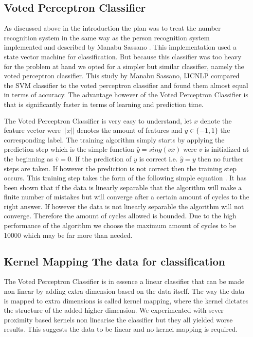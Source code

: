 \documentclass[%
        compressed,
        final,
        notitlepage,
        narroweqnarray,
        inline,
        twoside,
        ]{ieee}
\begin{document}
\subsection{Voted Perceptron Classifier}
As discussed above in the introduction the plan was to treat the number
recognition system in the same way as the person recognition system implemented
and described by Manabu Sassano \cite{Manabu}.
This implementation used a state vector machine for classification. But because
this classifier was too heavy for the problem at hand we opted for a simpler but
similar classifier, namely the voted perceptron classifier. This study by Manabu
Sassano, IJCNLP compared the SVM classifier to the voted perceptron classifier
and found them almost equal in terms of accuracy. The advantage however of the
Voted Perceptron Classifier is that is significantly faster in terms of learning
and prediction time.

The Voted Perceptron Classifier is very easy to understand, let $x$ denote the
feature vector were $||x||$ denotes the amount of features and $y \in \{-1,1\}$
the corresponding label. The training algorithm simply starts by applying the
prediction step which is the simple function $\hat{y} =
sing(\overline{v}\overline{x})$ were $\overline{v}$ is
initialized at the beginning as $\overline{v}=0$. If the prediction of $y$ is correct i.e.
$\hat{y}=y$
then no further steps are taken. If however the prediction is not correct then
the training step occurs. This training step takes the form of the following
simple equation . It has been shown that if the data is linearly separable that
the algorithm will make a finite number of mistakes but will converge after a
certain amount of cycles to the right answer. If however the data is not
linearly separable the algorithm will not converge. Therefore the amount of
cycles allowed is bounded. Due to the high performance of the algorithm we
choose the maximum amount of cycles to be 10000 which may be far more than
needed.

\subsection{Kernel Mapping The data for classification}
The Voted Perceptron Classifier is in essence a linear classifier that can be made non linear by adding extra dimension based on the data itself. The way the data is mapped to extra dimensions is called kernel mapping, where the kernel dictates the structure of the added higher dimension. We experimented with sever proximity based kernels non linearise the classifier but they all yielded worse results. This suggests the data to be linear and no kernel mapping is required.
\end{document}
